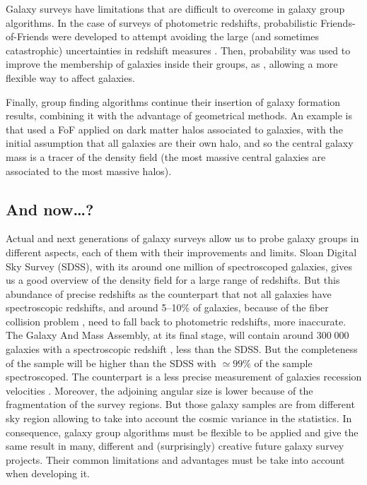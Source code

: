 Galaxy surveys have limitations that are difficult to overcome in galaxy group
algorithms. In the case of surveys of photometric redshifts, probabilistic
Friends-of-Friends were developed to attempt avoiding the large (and sometimes
catastrophic) uncertainties in redshift measures \citep{Liu+08}. Then,
probability was used to improve the membership of galaxies inside their groups,
as \citet{DominguezRomero+12}, allowing a more flexible way to affect galaxies.

Finally, group finding algorithms continue their insertion of galaxy formation
results, combining it with the advantage of geometrical methods. An example is
\citet{MunozCuartas+12} that used a FoF applied on dark matter halos associated
to galaxies, with the initial assumption that all galaxies are their own halo,
and so the central galaxy mass is a tracer of the density field (the most
massive central galaxies are associated to the most massive halos).

\subsection{And now\ldots?}
\label{sub:and_now}

Actual and next generations of galaxy surveys allow us to probe galaxy groups
in different aspects, each of them with their improvements and limits. Sloan
Digital Sky Survey (SDSS), with its around one million of spectroscoped
galaxies, gives us a good overview of the density field for a large range of
redshifts. But this abundance of precise redshifts as the counterpart that not
all galaxies have spectroscopic redshifts, and around 5--10\% of galaxies,
because of the fiber collision problem \citep{Blanton+03}, need to fall back to
photometric redshifts, more inaccurate. The Galaxy And Mass Assembly, at its
final stage, will contain around $300\;000$ galaxies with a spectroscopic
redshift \citep{Hopkins+13}, less than the SDSS\@. But the completeness of the
sample will be higher than the SDSS with $\simeq99\%$ of the sample
spectroscoped. The counterpart is a less precise measurement of galaxies
recession velocities \citep{Robotham+11,Hopkins+13}. Moreover, the adjoining
angular size is lower because of the fragmentation of the survey regions. But
those galaxy samples are from different sky region allowing to take into
account the cosmic variance in the statistics. In consequence, galaxy group
algorithms must be flexible to be applied and give the same result in many,
different and (surprisingly) creative future galaxy survey projects. Their
common limitations and advantages must be take into account when developing it.

